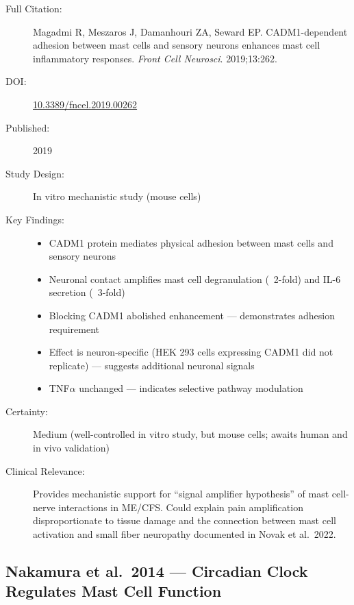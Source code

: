 \begin{description}
    \item[Full Citation:] Magadmi R, Meszaros J, Damanhouri ZA, Seward EP. CADM1-dependent adhesion between mast cells and sensory neurons enhances mast cell inflammatory responses. \textit{Front Cell Neurosci}. 2019;13:262.
    \item[DOI:] \href{https://doi.org/10.3389/fncel.2019.00262}{10.3389/fncel.2019.00262}
    \item[Published:] 2019
    \item[Study Design:] In vitro mechanistic study (mouse cells)
    \item[Key Findings:]
    \begin{itemize}
        \item CADM1 protein mediates physical adhesion between mast cells and sensory neurons
        \item Neuronal contact amplifies mast cell degranulation (~2-fold) and IL-6 secretion (~3-fold)
        \item Blocking CADM1 abolished enhancement --- demonstrates adhesion requirement
        \item Effect is neuron-specific (HEK 293 cells expressing CADM1 did not replicate) --- suggests additional neuronal signals
        \item TNF$\alpha$ unchanged --- indicates selective pathway modulation
    \end{itemize}
    \item[Certainty:] Medium (well-controlled in vitro study, but mouse cells; awaits human and in vivo validation)
    \item[Clinical Relevance:] Provides mechanistic support for ``signal amplifier hypothesis'' of mast cell-nerve interactions in ME/CFS. Could explain pain amplification disproportionate to tissue damage and the connection between mast cell activation and small fiber neuropathy documented in Novak et al.\ 2022.
\end{description}

\subsection{Nakamura et al.\ 2014 --- Circadian Clock Regulates Mast Cell Function}

